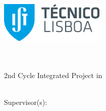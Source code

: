
\begin{titlepage}
\includegraphics[width=5cm]{images/ist_logo}~\\[2.0cm]
\begin{center}
{\LARGE \textbf{\Title}}\\[4.0cm]
{\LARGE \textbf{\StudentName}}\\[3.0cm]
{\large 2nd Cycle Integrated Project in}\\[.4cm]
{\LARGE \textbf{\DegreeName}}\\[1.5cm]

\begin{minipage}[t]{.5\textwidth}
  \begin{flushright}
    {\large Supervisor(s):\:}
  \end{flushright}
\end{minipage}%
\begin{minipage}[t]{.5\textwidth}
  \begin{flushleft}
    {\Supervisors}
  \end{flushleft}
\end{minipage}\\[4.0cm]


{\Large \textbf{\Month\:\Year}}\\
\end{center}
\end{titlepage}
